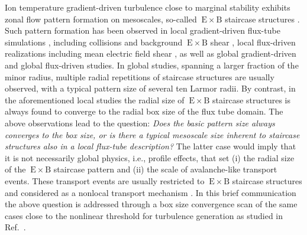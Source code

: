 \documentclass[aip, amsmath, amssymb, reprint, twocolumn, floatfix]{revtex4-1}
\newcommand{\exb}{\mathrm{\:E}\times\mathrm{B}}
\begin{document}
Ion temperature gradient-driven turbulence close to marginal stability exhibits zonal flow pattern formation on mesoscales, so-called $\exb$ staircase structures \cite{Pradalier2010}.
Such pattern formation has been observed in local gradient-driven flux-tube simulations \cite{Peeters2016, Rath2021}, including collisions \cite{Weikl2017} and background $\exb$ shear \cite{Rath2021}, local flux-driven realizations including mean electric field shear \cite{Seiferling2019}, as well as global gradient-driven \cite{McMillan2009, Villard2013, Seo2022} and global flux-driven \cite{Pradalier2010, Pradalier2015, Wang2020, Kim2022, Kishimoto2023} studies. 
In global studies, spanning a larger fraction of the minor radius, multiple radial repetitions of staircase structures are usually observed, with a typical pattern size of several ten Larmor radii.
By contrast, in the aforementioned local studies the radial size of $\exb$ staircase structures is always found to converge to the radial box size of the flux tube domain.
The above observations lead to the question: 
\textit{Does the basic pattern size always converges to the box size, or is there a typical mesoscale size inherent to staircase structures also in a local flux-tube description?}
The latter case would imply that it is not necessarily global physics, i.e., profile effects, that set (i) the radial size of the $\exb$ staircase pattern and (ii) the scale of avalanche-like transport events. These transport events are usually restricted to $\exb$ staircase structures and considered as a nonlocal transport mechanism \cite{Pradalier2010}. 
In this brief communication the above question is addressed through a box size convergence scan of the same cases close to the nonlinear threshold for turbulence generation as studied in Ref.~.\bigskip

\end{document}
